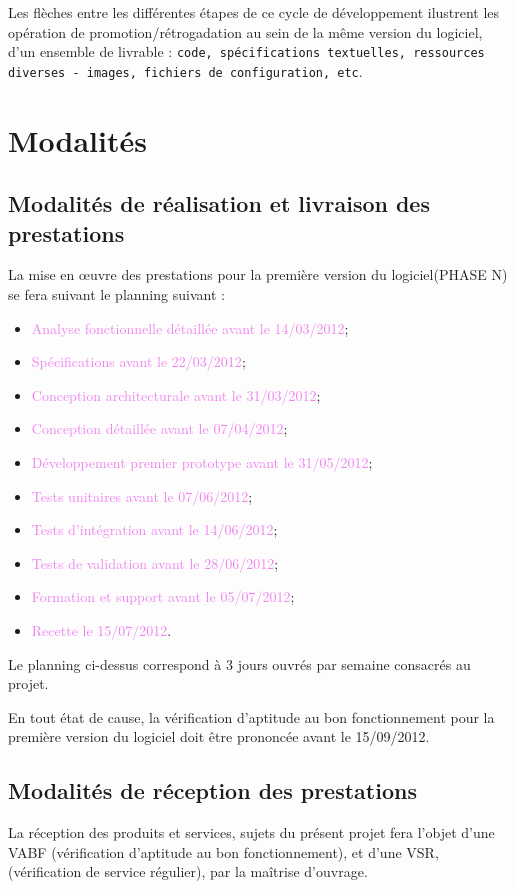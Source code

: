 \documentclass{bouygues-fr}
\begin{document}
Les flèches entre les différentes étapes de ce cycle de développement ilustrent les opération de promotion/rétrogadation au sein de la même version du logiciel, d'un ensemble de livrable : \texttt{code, spécifications textuelles, ressources diverses - images, fichiers de configuration, etc}.

\vspace{20pt}
\section{Modalités}

\subsection{Modalités de réalisation et livraison des prestations}
La mise en œuvre des prestations pour la première version du logiciel(PHASE N) se fera suivant le planning suivant :
\begin{itemize}
\item \textcolor{violet}{Analyse fonctionnelle détaillée avant le 14/03/2012};
\item \textcolor{violet}{Spécifications avant le 22/03/2012};
\item \textcolor{violet}{Conception architecturale avant le 31/03/2012};
\item \textcolor{violet}{Conception détaillée avant le 07/04/2012};
\item \textcolor{violet}{Développement premier prototype avant le 31/05/2012};
\item \textcolor{violet}{Tests unitaires avant le 07/06/2012};
\item \textcolor{violet}{Tests d'intégration avant le 14/06/2012};
\item \textcolor{violet}{Tests de validation avant le 28/06/2012};
\item \textcolor{violet}{Formation et support avant le 05/07/2012};
\item \textcolor{violet}{Recette le 15/07/2012}.
\end{itemize}

Le planning ci-dessus correspond à 3 jours ouvrés par semaine consacrés au projet.

En tout état de cause, la vérification d’aptitude au bon fonctionnement pour la \\première version du logiciel doit être prononcée avant le 15/09/2012.

\subsection{Modalités de réception des prestations}
La réception des produits et services, sujets du présent projet fera l’objet d’une VABF (vérification d’aptitude au bon fonctionnement), et d’une VSR, (vérification de service régulier), par la maîtrise d'ouvrage.
\end{document}
